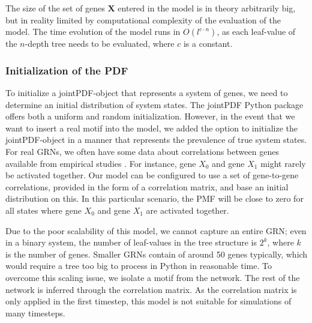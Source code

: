 \documentclass[../main.tex]{subfiles}
\begin{document}
The size of the set of genes $\mathbf{X}$ entered in the model is in theory arbitrarily big, but in reality limited by computational complexity of the evaluation of the model.
The time evolution of the model runs in $O(l^{c \cdot n})$, as each leaf-value of the $n$-depth tree needs to be evaluated, where $c$ is a constant. 

\subsubsection{Initialization of the PDF}

To initialize a jointPDF-object that represents a system of genes, we need to determine an initial distribution of system states.
The jointPDF Python package offers both a uniform and random initialization.
However, in the event that we want to insert a real motif into the model, we added the option to initialize the jointPDF-object in a manner that represents the prevalence of true system states.
For real GRNs, we often have some data about correlations between genes available from empirical studies \cite{ideker2001integrated}.
For instance, gene $X_0$ and gene $X_1$ might rarely be activated together.
Our model can be configured to use a set of gene-to-gene correlations, provided in the form of a correlation matrix, and base an initial distribution on this.
In this particular scenario, the PMF will be close to zero for all states where gene $X_0$ and gene $X_1$ are activated together.

Due to the poor scalability of this model, we cannot capture an entire GRN; even in a binary system, the number of leaf-values in the tree structure is $2^k$, where $k$ is the number of genes.
Smaller GRNs contain of around 50 genes typically, which would require a tree too big to process in Python in reasonable time.
To overcome this scaling issue, we isolate a motif from the network.
The rest of the network is inferred through the correlation matrix.
As the correlation matrix is only applied in the first timestep, this model is not suitable for simulations of many timesteps.
\end{document}

